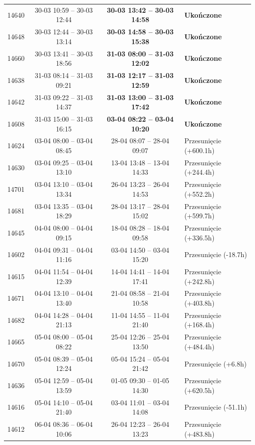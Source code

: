 \begin{table}[htbp]
\begin{tabular}{|r|c|c|l|}
14640 & 30-03 10:59 -- 30-03 12:44 & \textbf{30-03 13:42 -- 30-03 14:58} & \textbf{Ukończone} \\ 
14648 & 30-03 12:44 -- 30-03 13:14 & \textbf{30-03 14:58 -- 30-03 15:38} & \textbf{Ukończone} \\ 
14660 & 30-03 13:41 -- 30-03 18:56 & \textbf{31-03 08:00 -- 31-03 12:02} & \textbf{Ukończone} \\ 
14638 & 31-03 08:14 -- 31-03 09:21 & \textbf{31-03 12:17 -- 31-03 12:59} & \textbf{Ukończone} \\ 
14642 & 31-03 09:22 -- 31-03 14:37 & \textbf{31-03 13:00 -- 31-03 17:42} & \textbf{Ukończone} \\ 
14608 & 31-03 15:00 -- 31-03 16:15 & \textbf{03-04 08:22 -- 03-04 10:20} & \textbf{Ukończone} \\ 
14624 & 03-04 08:00 -- 03-04 08:45 & 28-04 08:07 -- 28-04 09:07 & Przesunięcie (+600.1h) \\ 
14630 & 03-04 09:25 -- 03-04 13:10 & 13-04 13:48 -- 13-04 14:33 & Przesunięcie (+244.4h) \\ 
14701 & 03-04 13:10 -- 03-04 13:34 & 26-04 13:23 -- 26-04 14:53 & Przesunięcie (+552.2h) \\ 
14681 & 03-04 13:35 -- 03-04 18:29 & 28-04 13:17 -- 28-04 15:02 & Przesunięcie (+599.7h) \\ 
14645 & 04-04 08:00 -- 04-04 09:15 & 18-04 08:28 -- 18-04 09:58 & Przesunięcie (+336.5h) \\ 
14602 & 04-04 09:31 -- 04-04 11:16 & 03-04 14:50 -- 03-04 15:20 & Przesunięcie (-18.7h) \\ 
14615 & 04-04 11:54 -- 04-04 12:39 & 14-04 14:41 -- 14-04 17:41 & Przesunięcie (+242.8h) \\ 
14671 & 04-04 13:10 -- 04-04 13:40 & 21-04 08:58 -- 21-04 10:58 & Przesunięcie (+403.8h) \\ 
14682 & 04-04 14:28 -- 04-04 21:13 & 11-04 14:55 -- 11-04 21:40 & Przesunięcie (+168.4h) \\ 
14665 & 05-04 08:00 -- 05-04 08:22 & 25-04 12:26 -- 25-04 13:50 & Przesunięcie (+484.4h) \\ 
14670 & 05-04 08:39 -- 05-04 12:24 & 05-04 15:24 -- 05-04 21:42 & Przesunięcie (+6.8h) \\ 
14636 & 05-04 12:59 -- 05-04 13:59 & 01-05 09:30 -- 01-05 14:30 & Przesunięcie (+620.5h) \\ 
14616 & 05-04 14:10 -- 05-04 21:40 & 03-04 11:01 -- 03-04 14:08 & Przesunięcie (-51.1h) \\ 
14612 & 06-04 08:36 -- 06-04 10:06 & 26-04 12:23 -- 26-04 13:23 & Przesunięcie (+483.8h) \\ 

\end{tabular}
\end{table}
